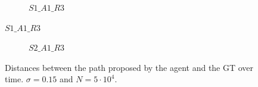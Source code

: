 \begin{figure}[H]
     \centering
     \begin{subfigure}[b]{0.9\textwidth}
         \centering
         
         \caption{$S1\_A1\_R3$}
     \end{subfigure}
\end{figure}
\begin{figure}\ContinuedFloat
     \begin{subfigure}[b]{0.9\textwidth}
         \centering
         
         \caption{$S2\_A1\_R3$}
     \end{subfigure}
        \caption{Distances between the path proposed by the agent and the GT over time. $\sigma = 0.15$ and $N=5\cdot 10^4$.}
        \label{fig:advCurves1}
\end{figure}


